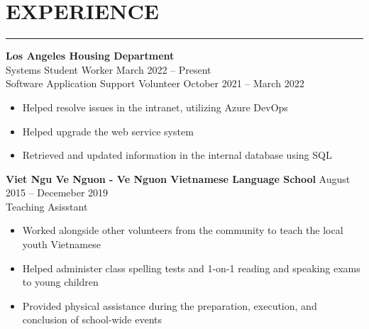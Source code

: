 \documentclass{article}
\begin{document}
\section*{EXPERIENCE} \vspace{-6pt} \hrule \vspace{6pt}
\textbf{Los Angeles Housing Department}\\
Systems Student Worker \hfill March 2022 -- Present\\
Software Application Support Volunteer \hfill October 2021 -- March 2022
\begin{itemize}
	\item\vspace{-6pt} Helped resolve issues in the intranet, utilizing Azure DevOps
	\item\vspace{-6pt} Helped upgrade the web service system
	\item\vspace{-6pt} Retrieved and updated information in the internal database using SQL
\end{itemize}
\vspace{-6pt}
\textbf{Viet Ngu Ve Nguon - Ve Nguon Vietnamese Language School} \hfill August 2015 -- Decemeber 2019\\
Teaching Asisstant
\begin{itemize}
	\item\vspace{-6pt} Worked alongside other volunteers from the community to teach the local youth Vietnamese
	\item\vspace{-6pt} Helped administer class spelling tests and 1-on-1 reading and speaking exams to young children
	\item\vspace{-6pt} Provided physical assistance during the preparation, execution, and conclusion of school-wide events
\end{itemize}
\vspace{-10pt}
\end{document}
